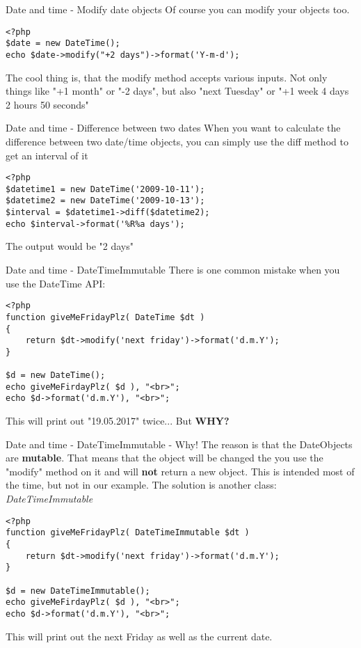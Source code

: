 \begin{frame}[fragile]{Date and time - Modify date objects}
Of course you can modify your objects too. \pause

\begin{lstlisting}
<?php
$date = new DateTime();
echo $date->modify("+2 days")->format('Y-m-d');
\end{lstlisting}
\pause
The cool thing is, that the modify method accepts various inputs. Not only things like "+1 month" or "-2 days", but also "next Tuesday" or "+1 week 4 days 2 hours 50 seconds"
\end{frame}


\begin{frame}[fragile]{Date and time - Difference between two dates}
When you want to calculate the difference between two date/time objects, you can simply use the diff method to get an interval of it\pause

\begin{lstlisting}
<?php
$datetime1 = new DateTime('2009-10-11');
$datetime2 = new DateTime('2009-10-13');
$interval = $datetime1->diff($datetime2);
echo $interval->format('%R%a days');
\end{lstlisting}

\pause The output would be "2 days"
\end{frame}

\begin{frame}[fragile]{Date and time - DateTimeImmutable}
There is one common mistake when you use the DateTime API: \pause
\begin{lstlisting}
<?php
function giveMeFridayPlz( DateTime $dt )
{
    return $dt->modify('next friday')->format('d.m.Y');
}

$d = new DateTime();
echo giveMeFirdayPlz( $d ), "<br>";
echo $d->format('d.m.Y'), "<br>";
\end{lstlisting}

This will print out "19.05.2017" twice... \pause
But \textbf{WHY?}
\end{frame}

\begin{frame}[fragile]{Date and time - DateTimeImmutable - Why!}
The reason is that the DateObjects are \textbf{mutable}. That means that the object will be changed the you use the "modify" method on it and will \textbf{not} return a new object. This is intended most of the time, but not in our example. \pause The solution is another class: \emph{DateTimeImmutable}
\begin{lstlisting}
<?php
function giveMeFridayPlz( DateTimeImmutable $dt )
{
    return $dt->modify('next friday')->format('d.m.Y');
}

$d = new DateTimeImmutable();
echo giveMeFirdayPlz( $d ), "<br>";
echo $d->format('d.m.Y'), "<br>";
\end{lstlisting}

This will print out the next Friday as well as the current date.
\end{frame}

